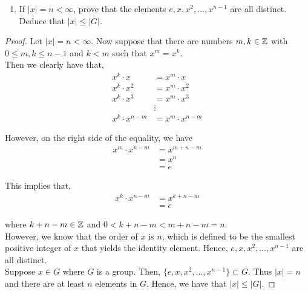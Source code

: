 \documentclass[11pt, reqno]{amsart}
\theoremstyle{plain}
\theoremstyle{definition}
\theoremstyle{example}
\begin{document}
\begin{enumerate}[1.]
\begin{enumerate}
\begin{proof}
Since $x^2 = xx = e$ and $y^2 = yy = e$, we have that $x = x^{-1}$ and $y = y^{-1}$. If $|xy| = 1$ or $|xy| = 2$, then $xy = (xy)^{-1}$ and
\begin{align*}
xy = (xy)^{-1} = y^{-1}x^{-1} = yx
\end{align*}

as required

\end{proof}

\item If $|x| = n < \infty$, prove that the elements $e, x, x^2, \dots, x^{n-1}$ are all distinct. Deduce that $|x| \leq |G|$. 
\end{enumerate}

\begin{proof}
Let $|x| = n < \infty$. Now suppose that there are numbers $m, k \in \mathbb{Z}$ with $0 \leq m, k \leq n-1$ and $k < m$ such that $x^m = x^k$.\\

Then we clearly have that,
\begin{align*}
x^k \cdot x &= x^m \cdot x\\
x^k \cdot x^2 &= x^m \cdot x^2\\
x^k \cdot x^3 &= x^m \cdot x^3\\
&\vdots\\
x^k \cdot x^{n-m} &= x^m \cdot x^{n-m}
\end{align*}

However, on the right side of the equality, we have
\begin{align*}
x^m \cdot x^{n-m} &= x^{m+n-m}\\
&= x^n\\
&= e
\end{align*}

This implies that,
\begin{align*}
x^k \cdot x^{n-m} &= x^{k+n-m}\\
&= e
\end{align*}

where $k+n-m \in \mathbb{Z}$ and $0 < k+n-m < m+n-m = n$.\\

However, we know that the order of $x$ is $n$, which is defined to be the smallest positive integer of $x$ that yields the identity element. Hence, $e, x, x^2, \dots, x^{n-1}$ are all distinct.\\

Suppose $x \in G$ where $G$ is a group. Then, $\{e, x, x^2, \dots, x^{n-1}\} \subset G$. Thus $|x| = n$ and there are at least $n$ elements in $G$. Hence, we have that $|x| \leq |G|$.
\end{proof}




\end{enumerate}
\end{document}
